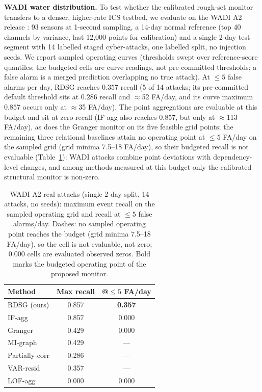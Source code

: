 \documentclass[11pt,a4paper]{article}
\newcommand{\RDSG}{RDSG}
\begin{document}
\textbf{WADI water distribution.} To test whether the calibrated rough-set monitor
transfers to a denser, higher-rate ICS testbed, we evaluate on the WADI
A2 release \citep{ahmed2017wadi}: 93 sensors at 1-second sampling, a
14-day normal reference (top 40 channels by variance, last 12{,}000 points
for calibration) and a single 2-day test segment with 14 labelled staged
cyber-attacks, one labelled split, no injection seeds. We report sampled
operating curves (thresholds swept over reference-score quantiles; the
budgeted cells are curve readings, not pre-committed thresholds; a false
alarm is a merged prediction overlapping no true attack). At $\le 5$ false
alarms per day, \RDSG{} reaches $0.357$ recall (5 of 14 attacks; its
pre-committed default threshold sits at $0.286$ recall and $\approx$52
FA/day, and its curve maximum $0.857$ occurs only at $\approx$35 FA/day).
The point aggregations are evaluable at this budget and sit at zero
recall (IF-agg also reaches $0.857$, but only at $\approx$113
FA/day), as does the Granger monitor on its five feasible grid points;
the remaining three relational baselines attain no operating point at
$\le 5$ FA/day on the sampled grid (grid minima 7.5--18
FA/day), so their budgeted recall is not evaluable
(Table~\ref{tab:wadi}): WADI attacks combine point deviations
with dependency-level changes, and among methods measured at this budget
only the calibrated structural monitor is non-zero.

\begin{table}[t]\centering\small
\caption{WADI A2 real attacks (single 2-day split, 14 attacks, no seeds):
maximum event recall on the sampled operating grid and recall at $\le 5$
false alarms/day. Dashes: no sampled operating point reaches the budget (grid minima
7.5--18 FA/day), so the cell is not evaluable, not zero;
0.000 cells are evaluated observed zeros. Bold marks the budgeted operating point of the proposed monitor.}
\label{tab:wadi}
\begin{tabular}{lcc}\hline
Method & Max recall & @$\le 5$ FA/day \\
\hline
RDSG (ours) & 0.857 & \textbf{0.357} \\
IF-agg & 0.857 & 0.000 \\
Granger & 0.429 & 0.000 \\
MI-graph & 0.429 & --- \\
Partially-corr & 0.286 & --- \\
VAR-resid & 0.357 & --- \\
LOF-agg & 0.000 & 0.000 \\
\hline
\end{tabular}
\end{table}
\end{document}
